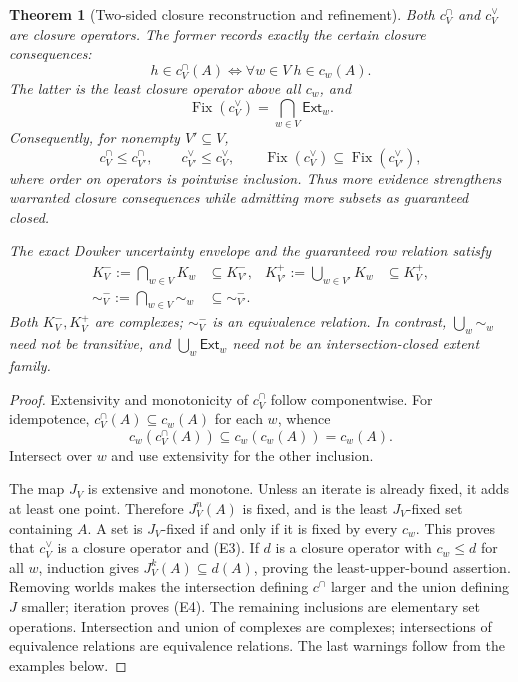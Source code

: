 \documentclass[11pt]{article}
\newtheorem{theorem}{Theorem}[section]
\theoremstyle{definition}
\newcommand{\Ext}{\mathsf{Ext}}
\newcommand{\Fix}{\operatorname{Fix}}
\begin{document}
\begin{theorem}[Two-sided closure reconstruction and refinement]\label{thm:envelopes}
Both $c^{\cap}_V$ and $c^{\vee}_V$ are closure operators. The former records exactly the \emph{certain closure consequences}:
\[
 h\in c^{\cap}_V(A)\Longleftrightarrow\forall w\in V\ h\in c_w(A).
\]
The latter is the least closure operator above all $c_w$, and
\[
 \Fix(c^{\vee}_V)=\bigcap_{w\in V}\Ext_w. \tag{E3}
\]
Consequently, for nonempty $V'\subseteq V$,
\[
 c^{\cap}_V\le c^{\cap}_{V'},\qquad
 c^{\vee}_{V'}\le c^{\vee}_V,\qquad
 \Fix(c^{\vee}_V)\subseteq\Fix(c^{\vee}_{V'}), \tag{E4}
\]
where order on operators is pointwise inclusion. Thus more evidence strengthens warranted closure consequences while admitting more subsets as guaranteed closed.

The exact Dowker uncertainty envelope and the guaranteed row relation satisfy
\begin{align*}
 K^-_V:=\bigcap_{w\in V}K_w&\subseteq K^-_{V'},&
 K^+_{V'}:=\bigcup_{w\in V'}K_w&\subseteq K^+_V,\\
 {\sim}^{-}_V:=\bigcap_{w\in V}{\sim}_w&\subseteq{\sim}^{-}_{V'}.
\end{align*}
Both $K^-_V,K^+_V$ are complexes; ${\sim}^{-}_V$ is an equivalence relation. In contrast, $\bigcup_w{\sim}_w$ need not be transitive, and $\bigcup_w\Ext_w$ need not be an intersection-closed extent family.
\end{theorem}
\begin{proof}
Extensivity and monotonicity of $c^{\cap}_V$ follow componentwise. For idempotence, $c^{\cap}_V(A)\subseteq c_w(A)$ for each $w$, whence
\[
 c_w(c^{\cap}_V(A))\subseteq c_w(c_w(A))=c_w(A).
\]
Intersect over $w$ and use extensivity for the other inclusion.

The map $J_V$ is extensive and monotone. Unless an iterate is already fixed, it adds at least one point. Therefore $J_V^n(A)$ is fixed, and is the least $J_V$-fixed set containing $A$. A set is $J_V$-fixed if and only if it is fixed by every $c_w$. This proves that $c^{\vee}_V$ is a closure operator and (E3). If $d$ is a closure operator with $c_w\le d$ for all $w$, induction gives $J_V^k(A)\subseteq d(A)$, proving the least-upper-bound assertion. Removing worlds makes the intersection defining $c^{\cap}$ larger and the union defining $J$ smaller; iteration proves (E4). The remaining inclusions are elementary set operations. Intersection and union of complexes are complexes; intersections of equivalence relations are equivalence relations. The last warnings follow from the examples below.
\end{proof}
\end{document}
